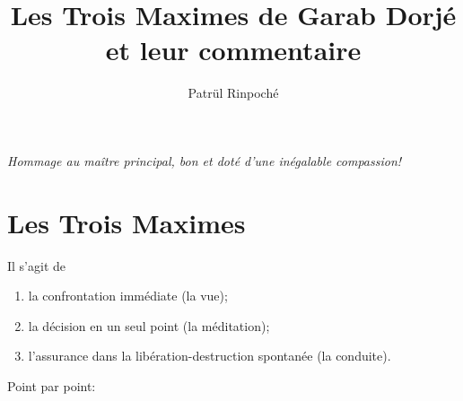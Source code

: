 \documentclass[a4paper]{article}
\title{Les Trois Maximes de Garab Dorjé et leur commentaire}
\author{Patrül Rinpoché}
\begin{document}
\maketitle

\begin{flushright}
\emph{Hommage au maître principal, bon et doté d'une inégalable
  compassion!}
\end{flushright}


\section{Les Trois Maximes}

Il s'agit de

\begin{enumerate}

  \item la confrontation immédiate (la vue);

  \item la décision en un seul point (la méditation);

  \item l'assurance dans la libération-destruction spontanée (la
        conduite).

\end{enumerate}

Point par point:
\end{document}
